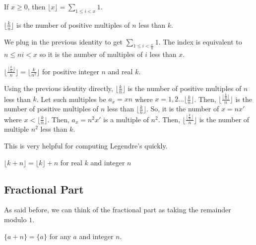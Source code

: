 \documentclass{article}
\begin{document}
\begin{theo}[]
If $x\ge 0$, then $\lfloor x \rfloor = \sum_{1\leq i < x} 1$.
\end{theo}

\begin{theo}[]
$\lfloor \frac{k}{n} \rfloor$ is the number of positive multiples of $n$ less than $k$.
\end{theo}

\begin{pro}[]
We plug in the previous identity to get $\sum_{1\leq i < \frac{x}{n}} 1$. The index is equivalent to $n\leq ni < x$ so it is the number of multiples of $i$ less than $x$.
\end{pro}

\begin{theo}[]
$\lfloor \frac{\lfloor \frac{k}{n} \rfloor}{n} \rfloor = \lfloor \frac{k}{n^2}\rfloor$ for positive integer $n$ and real $k$.
\end{theo}

\begin{pro}[]
Using the previous identity directly, $\lfloor \frac{k}{n} \rfloor$ is the number of positive multiples of $n$ less than $k$. Let such multiples be $a_{x}=xn$ where $x=1,2\ldots \lfloor \frac{k}{n} \rfloor$. Then, $\lfloor \frac{\lfloor \frac{k}{n} \rfloor}{n} \rfloor$ is the number of positive multiples of $n$ less than $\lfloor \frac{k}{n} \rfloor$. So, it is the number of $x=nx'$ where $x<\lfloor \frac{k}{n} \rfloor$. Then, $a_{x}=n^2x'$ is a multiple of $n^2$. Then, $\lfloor \frac{\lfloor \frac{k}{n} \rfloor}{n} \rfloor$ is the number of multiple  $n^2$ less than $k$.
\end{pro}

This is very helpful for computing Legendre's quickly.

\begin{theo}
$\lfloor k+n\rfloor = \lfloor k \rfloor + n$ for real $k$ and integer $n$
\end{theo}

\begin{theo}

\end{theo}
\subsection{Fractional Part}

As said before, we can think of the fractional part as taking the remainder modulo $1$.

\begin{theo}
$\{a+n\}=\{a\}$ for any $a$ and integer $n$.
\end{theo}
\end{document}
